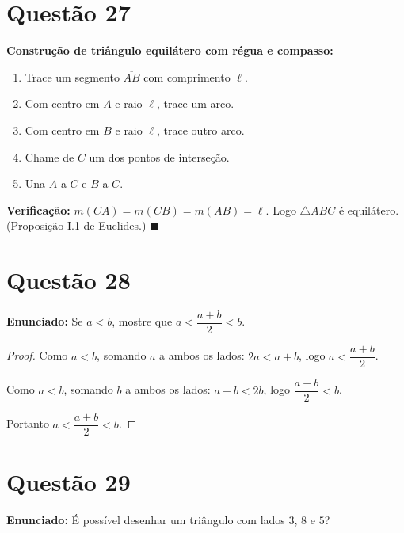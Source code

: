 \documentclass[12pt,a4paper]{article}
\begin{document}
\section*{Quest\~ao 27}

\textbf{Constru\c{c}\~ao de tri\^angulo equil\'atero com r\'egua e compasso:}

\begin{enumerate}
\item Trace um segmento $\overline{AB}$ com comprimento $\ell$.
\item Com centro em $A$ e raio $\ell$, trace um arco.
\item Com centro em $B$ e raio $\ell$, trace outro arco.
\item Chame de $C$ um dos pontos de interse\c{c}\~ao.
\item Una $A$ a $C$ e $B$ a $C$.
\end{enumerate}

\textbf{Verifica\c{c}\~ao:} $m(CA) = m(CB) = m(AB) = \ell$. Logo $\triangle ABC$ \'e equil\'atero. (Proposi\c{c}\~ao I.1 de Euclides.) $\blacksquare$

\section*{Quest\~ao 28}

\textbf{Enunciado:} Se $a < b$, mostre que $a < \dfrac{a+b}{2} < b$.

\begin{proof}
Como $a < b$, somando $a$ a ambos os lados: $2a < a+b$, logo $a < \dfrac{a+b}{2}$.

Como $a < b$, somando $b$ a ambos os lados: $a+b < 2b$, logo $\dfrac{a+b}{2} < b$.

Portanto $a < \dfrac{a+b}{2} < b$.
\end{proof}

\section*{Quest\~ao 29}

\textbf{Enunciado:} \'E poss\'ivel desenhar um tri\^angulo com lados $3$, $8$ e $5$?
\end{document}
